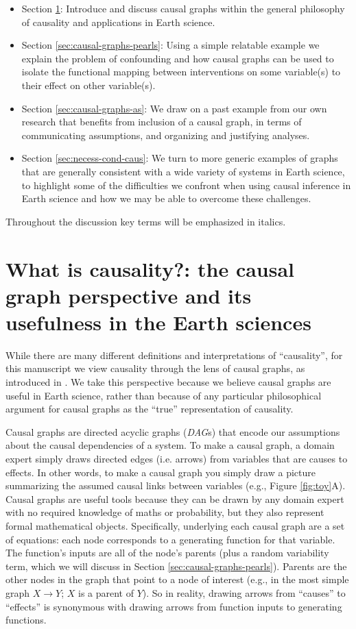 \documentclass[12pt]{article}
\begin{document}
\begin{itemize}
\item Section \ref{sec:what-caus-caus}: Introduce and discuss causal
  graphs within the general philosophy of causality and applications
  in Earth science.
\item Section \ref{sec:causal-graphs-pearls}: Using a simple relatable
  example we explain the problem of confounding and how causal graphs
  can be used to isolate the functional mapping between interventions
  on some variable(s) to their effect on other variable(s).
\item Section \ref{sec:causal-graphs-as}: We draw on a past example
  from our own research that benefits from inclusion of a causal
  graph, in terms of communicating assumptions, and organizing and
  justifying analyses.
\item Section \ref{sec:necess-cond-caus}: We turn to more generic
  examples of graphs that are generally consistent with a wide variety
  of systems in Earth science, to highlight some of the difficulties
  we confront when using causal inference in Earth science and how we
  may be able to overcome these challenges.
\end{itemize}

Throughout the discussion key terms will be emphasized in italics.

\section{What is causality?: the causal graph perspective and its
  usefulness in the Earth sciences}\label{sec:what-caus-caus}

While there are many different definitions and interpretations of
``causality'', for this manuscript we view causality through the lens
of causal graphs, as introduced in \citet{pearl1995causal}. We take
this perspective  because we believe causal graphs are useful in Earth
science, rather than because of any particular philosophical argument
for causal graphs as the ``true'' representation of causality.

Causal graphs are directed acyclic graphs (\emph{DAG}s) that encode our
assumptions about the causal dependencies of a system.  To make a
causal graph, a domain expert simply draws directed edges
(i.e. arrows) from variables that are causes to effects. In other
words, to make a causal graph you simply draw a picture summarizing
the assumed causal links between variables (e.g., Figure
\ref{fig:toy}A). Causal graphs are useful tools because they can be
drawn by any domain expert with no required knowledge of maths or
probability, but they also represent formal mathematical
objects. Specifically, underlying each causal graph are a set of
equations: each node corresponds to a generating function for that
variable. The function's inputs are all of the node's parents (plus a
random variability term, which we will discuss in Section
\ref{sec:causal-graphs-pearls}). Parents are the other nodes in the
graph that point to a node of interest (e.g., in the most simple graph
$X \to Y$; $X$ is a parent of $Y$). So in reality, drawing arrows from
``causes'' to ``effects'' is synonymous with drawing arrows from
function inputs to generating functions.
\end{document}
